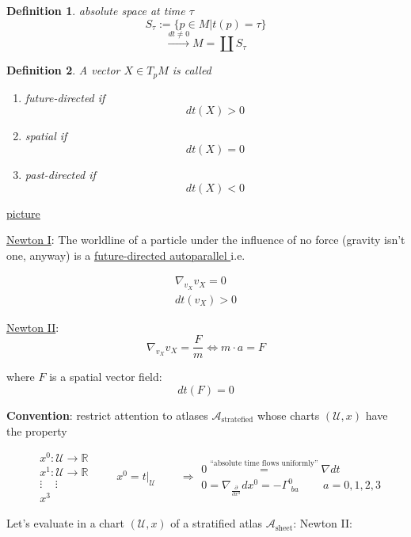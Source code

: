 \documentclass[10pt, twoside]{amsart}
\newtheorem{definition}{Definition}
\begin{document}
\begin{multicols*}{2}
\begin{definition}
  absolute space at time $\tau$ 
\[
S_{\tau} := \lbrace p\in M | t(p) = \tau \rbrace
\]
\[
\xrightarrow{ dt \neq 0 } M = \coprod S_{\tau}
\]
\end{definition}

\begin{definition} A vector $X \in T_p M$ is called 
\begin{enumerate}
\item[(a)] future-directed if 
\[
dt(X) > 0 
\]
\item[(b)] spatial if 
\[
dt(X) = 0 
\]
\item[(c)]
past-directed if 
\[
dt(X) < 0
\]
\end{enumerate}
\end{definition}

\underline{picture}

\underline{Newton I}: The worldline of a particle under the influence of no force (gravity isn't one, anyway) is a \underline{future-directed autoparallel } i.e.

\[
\begin{gathered}
  \nabla_{v_{X}} v_{X} = 0 \\
  dt(v_{X}) > 0 
\end{gathered}
\]

\underline{Newton II}: 
\[
\nabla_{v_{X}} v_X = \frac{F}{m} \Longleftrightarrow m \cdot a = F
\]


where $F$ is a spatial vector field:
\[
dt(F) = 0 
\]

\textbf{Convention}: restrict attention to atlases $\mathcal{A}_{\text{stratefied}}$ whose charts $(\mathcal{U}, x)$ have the property

\[
\begin{aligned}
  & x^0:\mathcal{U} \to \mathbb{R} \\ 
  & x^1: \mathcal{U} \to \mathbb{R} \\ 
  & \vdots \quad \, \vdots \\ 
  & x^3
\end{aligned}
\quad \quad \, 
x^0 = \left. t \right|_{\mathcal{U}}  \quad\quad \, \Longrightarrow \begin{gathered} 0 \overset{\text{``absolute time flows uniformly''} }{=} \nabla dt \\
0 = \nabla_{\frac{ \partial }{ \partial x^a} } dx^0 = - \Gamma_{ \, \, ba }^0 \quad \quad \, a = 0,1,2,3
\end{gathered}
\]

Let's evaluate in a chart $(\mathcal{U},x)$ of a stratified atlas $\mathcal{A}_{\text{sheet}}$: Newton II:


\end{multicols*}
\end{document}
